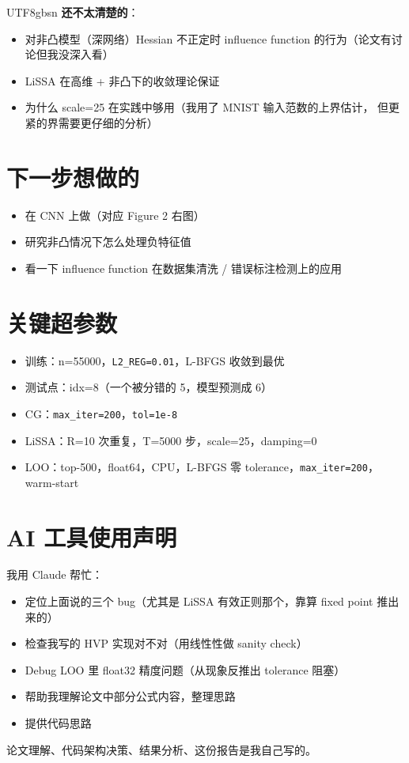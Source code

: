\documentclass[a4paper,11pt]{article}
\begin{document}
\begin{CJK*}{UTF8}{gbsn}
\textbf{还不太清楚的}：
\begin{itemize}[leftmargin=1.3em, itemsep=2pt]
  \item 对非凸模型（深网络）Hessian 不正定时 influence function 的行为（论文有讨论但我没深入看）
  \item LiSSA 在高维 + 非凸下的收敛理论保证
  \item 为什么 scale=25 在实践中够用（我用了 MNIST 输入范数的上界估计，
        但更紧的界需要更仔细的分析）
\end{itemize}

\section{下一步想做的}

\begin{itemize}[leftmargin=1.3em, itemsep=2pt]
  \item 在 CNN 上做（对应 Figure 2 右图）
  \item 研究非凸情况下怎么处理负特征值
  \item 看一下 influence function 在数据集清洗 / 错误标注检测上的应用
\end{itemize}

\appendix

\section{关键超参数}

\begin{itemize}[leftmargin=1.3em, itemsep=2pt]
  \item 训练：n=55000，\texttt{L2\_REG=0.01}，L-BFGS 收敛到最优
  \item 测试点：idx=8（一个被分错的 5，模型预测成 6）
  \item CG：\texttt{max\_iter=200}，\texttt{tol=1e-8}
  \item LiSSA：R=10 次重复，T=5000 步，scale=25，damping=0
  \item LOO：top-500，float64，CPU，L-BFGS 零 tolerance，\texttt{max\_iter=200}，warm-start
\end{itemize}

\section{AI 工具使用声明}

我用 Claude 帮忙：
\begin{itemize}[leftmargin=1.3em, itemsep=2pt]
  \item 定位上面说的三个 bug（尤其是 LiSSA 有效正则那个，靠算 fixed point 推出来的）
  \item 检查我写的 HVP 实现对不对（用线性性做 sanity check）
  \item Debug LOO 里 float32 精度问题（从现象反推出 tolerance 阻塞）
  \item 帮助我理解论文中部分公式内容，整理思路
  \item 提供代码思路
\end{itemize}

论文理解、代码架构决策、结果分析、这份报告是我自己写的。

\end{CJK*}
\end{document}
